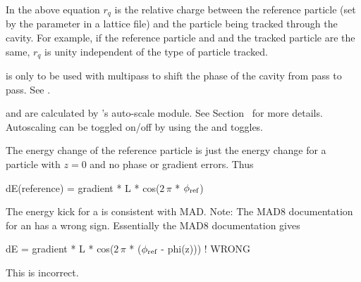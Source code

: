In the above equation $r_q$ is the relative charge between the reference particle (set by the
 parameter in a lattice file) and the particle being tracked through the
cavity. For example, if the reference particle and and the tracked particle are the same, $r_q$ is
unity independent of the type of particle tracked.

 is only to be used with multipass to shift the phase of the cavity from pass to
pass. See .

 and  are calculated by \bmad's auto-scale module. See
Section~ for more details. Autoscaling can be toggled on/off by using the
 and  toggles.

The energy change of the reference particle is just the energy change for a 
particle with $z = 0$ and no phase or gradient errors. Thus
\begin{example}
  dE(reference) = gradient * L * cos(\(2\,\pi\) * \(\phi_{\text{ref}}\))
\end{example}

The energy kick for a \bmad {} is consistent with MAD. 
Note: The MAD8 documentation for an  has a wrong
sign. Essentially the MAD8 documentation gives
\begin{example}
  dE = gradient * L * cos(\(2\,\pi\) * (\(\phi_{\text{ref}}\) - phi(z))) ! WRONG
\end{example}
This is incorrect. 

